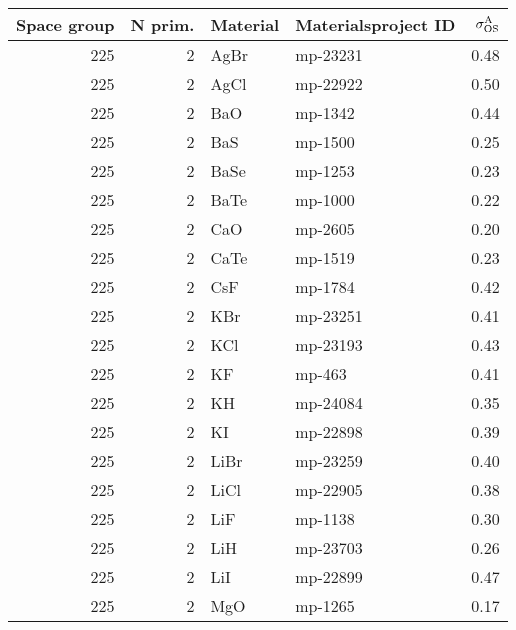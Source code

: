 \begin{table*}[t]
\small
  \begin{center}
\begin{tabular}{rrllr}
\toprule
 Space group &  N prim. &     Material & Materialsproject ID &  $\sigma^\mathrm{A}_\mathrm{OS}$ \\
\midrule

         225 &            2 &         AgBr &   mp-23231 &       0.48 \\
         225 &            2 &         AgCl &   mp-22922 &       0.50 \\
         225 &            2 &          BaO &    mp-1342 &       0.44 \\
         225 &            2 &          BaS &    mp-1500 &       0.25 \\
         225 &            2 &         BaSe &    mp-1253 &       0.23 \\
         225 &            2 &         BaTe &    mp-1000 &       0.22 \\
         225 &            2 &          CaO &    mp-2605 &       0.20 \\
         225 &            2 &         CaTe &    mp-1519 &       0.23 \\
         225 &            2 &          CsF &    mp-1784 &       0.42 \\
         225 &            2 &          KBr &   mp-23251 &       0.41 \\
         225 &            2 &          KCl &   mp-23193 &       0.43 \\
         225 &            2 &           KF &     mp-463 &       0.41 \\
         225 &            2 &           KH &   mp-24084 &       0.35 \\
         225 &            2 &           KI &   mp-22898 &       0.39 \\
         225 &            2 &         LiBr &   mp-23259 &       0.40 \\
         225 &            2 &         LiCl &   mp-22905 &       0.38 \\
         225 &            2 &          LiF &    mp-1138 &       0.30 \\
         225 &            2 &          LiH &   mp-23703 &       0.26 \\
         225 &            2 &          LiI &   mp-22899 &       0.47 \\
         225 &            2 &          MgO &    mp-1265 &       0.17 \\

\end{tabular}
\end{center}
\end{table*}
